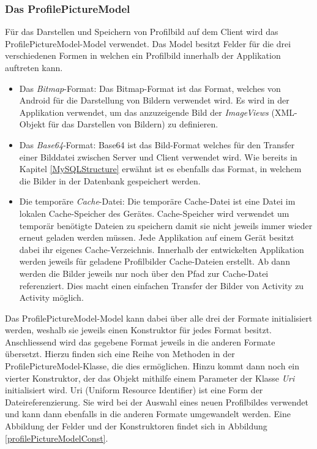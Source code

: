 \documentclass[../main.tex]{subfiles}
\begin{document}
	\subsubsection{Das ProfilePictureModel}
	Für das Darstellen und Speichern von Profilbild auf dem Client wird das ProfilePictureModel-Model verwendet. Das Model besitzt Felder für die drei verschiedenen Formen in welchen ein Profilbild innerhalb der Applikation auftreten kann.
	
	\begin{itemize}
		\item Das \emph{Bitmap}-Format: Das Bitmap-Format ist das Format, welches von Android für die Darstellung von Bildern verwendet wird. Es wird in der Applikation verwendet, um das anzuzeigende Bild der \emph{ImageViews} (XML-Objekt für das Darstellen von Bildern) zu definieren.
		\item Das \emph{Base64}-Format: Base64 ist das Bild-Format welches für den Transfer einer Bilddatei zwischen Server und Client verwendet wird. Wie bereits in Kapitel \ref{MySQLStructure} erwähnt ist es ebenfalls das Format, in welchem die Bilder in der Datenbank gespeichert werden.
		\item Die temporäre \emph{Cache}-Datei: Die temporäre Cache-Datei ist eine Datei im lokalen Cache-Speicher des Gerätes. Cache-Speicher wird verwendet um temporär benötigte Dateien zu speichern damit sie nicht jeweils immer wieder erneut geladen werden müssen. Jede Applikation auf einem Gerät besitzt dabei ihr eigenes Cache-Verzeichnis. Innerhalb der entwickelten Applikation werden jeweils für geladene Profilbilder Cache-Dateien erstellt. Ab dann werden die Bilder jeweils nur noch über den Pfad zur Cache-Datei referenziert. Dies macht einen einfachen Transfer der Bilder von Activity zu Activity möglich. \cite{cache}
	\end{itemize}

	Das ProfilePictureModel-Model kann dabei über alle drei der Formate initialisiert werden, weshalb sie jeweils einen Konstruktor für jedes Format besitzt. Anschliessend wird das gegebene Format jeweils in die anderen Formate übersetzt. Hierzu finden sich eine Reihe von Methoden in der ProfilePictureModel-Klasse, die dies ermöglichen. Hinzu kommt dann noch ein vierter Konstruktor, der das Objekt mithilfe einem Parameter der Klasse \emph{Uri} initialisiert wird. Uri (Uniform Resource Identifier) ist eine Form der Dateireferenzierung. Sie wird bei der Auswahl eines neuen Profilbildes verwendet und kann dann ebenfalls in die anderen Formate umgewandelt werden. Eine Abbildung der Felder und der Konstruktoren findet sich in Abbildung \ref{profilePictureModelConst}.
	
\end{document}
